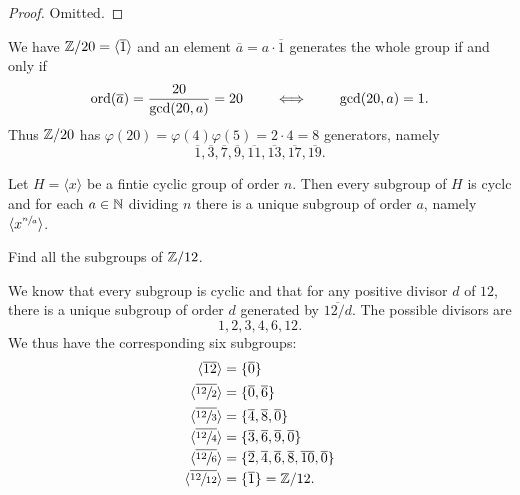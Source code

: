 \begin{proof}
    Omitted.
\end{proof}

\begin{example}
    We have $\mathbb{Z}/20 = \langle \overline 1 \rangle$ 
    and an element $\overline a = a \cdot \overline 1$ 
    generates the whole group if and only if
    \[
        \operatorname{ord}(\overline a) = \frac{20}{\gcd(20,a)} = 20 \qquad \iff \qquad \gcd(20,a) = 1.
    \]
    Thus $\mathbb{Z}/20$ has $\varphi(20) = \varphi(4) \varphi(5) = 2\cdot 4 = 8$ generators, namely
    \[
        \overline 1, \overline 3, \overline 7, \overline 9, 
            \overline{11}, \overline{13}, \overline{17}, \overline{19}.
    \]
\end{example}

\begin{theorem}[]
    Let $H = \langle x \rangle$ be a fintie cyclic group of order $n$.
    Then every subgroup of $H$ is cyclc 
    and for each $a \in \mathbb{N}$ dividing $n$ 
    there is a unique subgroup of order $a$,
    namely $\langle x^{\sfrac na} \rangle$.
\end{theorem}

\begin{example}
    Find all the subgroups of $\mathbb{Z}/12$.
\end{example}

\begin{solution}
    We know that every subgroup is cyclic
    and that for any positive divisor $d$ of $12$, 
    there is a unique subgroup of order $d$ generated by $\overline{12/d}$.
    The possible divisors are
    \[
        1,2,3,4,6,12.
    \]
    We thus have the corresponding six subgroups:
    \begin{align*}
        \langle \overline{12} \rangle    
            &= \{\overline 0\} \\
        \langle \overline{\sfrac{12}{2}} \rangle  
            &= \{\overline 0, \overline 6\} \\
        \langle \overline{\sfrac{12}{3}} \rangle  
            &= \{\overline 4, \overline 8, \overline 0\} \\
        \langle \overline{\sfrac{12}{4}} \rangle  
            &= \{\overline 3, \overline 6, \overline 9, \overline 0\} \\
        \langle \overline{\sfrac{12}{6}} \rangle  
            &= \{\overline 2, \overline 4, \overline 6, \overline 8, \overline{10}, \overline 0\} \\
        \langle \overline{\sfrac{12}{12}} \rangle 
            &= \{\overline 1\} = \mathbb{Z}/12.
    \end{align*}
\end{solution}

